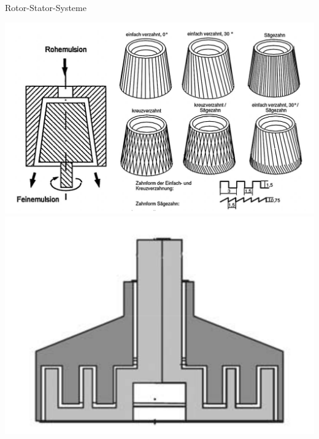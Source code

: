 \documentclass{beamer} %
\begin{document}
\begin{frame}{Rotor-Stator-Systeme}
	\hspace{-0.57cm}
	\vspace{1cm}
	\begin{minipage}{0.6\linewidth}
		\centering
		\includegraphics[width=\linewidth]{Markus/Kolloidmuehlen.png}\\
		\includegraphics[width=0.7\linewidth]{Markus/Zahnkranzdispergiermaschiene.png}
	\end{minipage}%
	\hspace{-0.3cm}
	\begin{minipage}{0.45\linewidth}

\end{minipage}
\end{frame}
\end{document}
